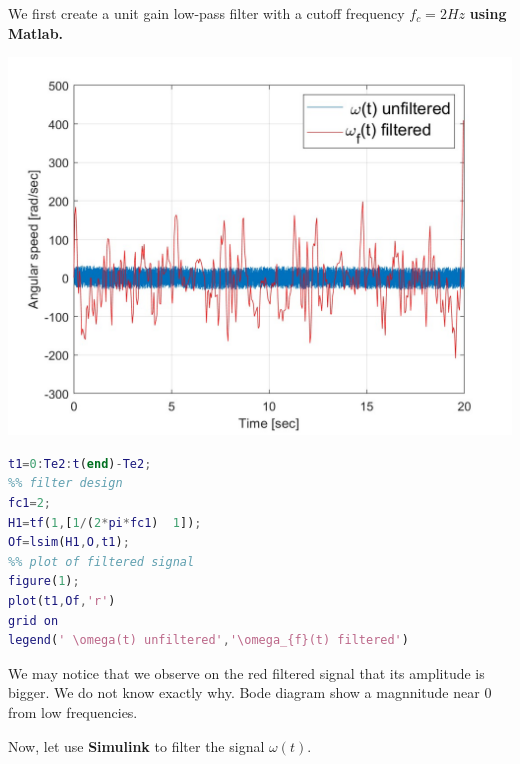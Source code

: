 \documentclass[a4paper,12pt]{article}
\begin{document}
\begin{enumerate}[label={\color{blue}\arabic*)}]
  We first create a unit gain low-pass filter with a cutoff frequency \(f_c = 2 Hz\) \textbf{using Matlab.}
  \begin{multicols}{2}
\begin{flushleft}
\includegraphics[scale=0.2]{Figures/q6a.jpg}
\label{F3}
\end{flushleft}
\columnbreak
\begin{lstlisting}[style=Matlab-editor,language=Matlab, caption={Code for Figure 4}, captionpos=b, basicstyle=\small\ttfamily]
%create the new time vector 
t1=0:Te2:t(end)-Te2;
%% filter design
fc1=2;
H1=tf(1,[1/(2*pi*fc1)  1]);
Of=lsim(H1,O,t1);
%% plot of filtered signal
figure(1);
plot(t1,Of,'r')
grid on
legend(' \omega(t) unfiltered','\omega_{f}(t) filtered')
\end{lstlisting}
\end{multicols}
We may notice that we observe on the red filtered signal that its amplitude is bigger. We do not know exactly why. Bode diagram show a magnnitude near 0 from low frequencies.

Now, let use \textbf{Simulink} to filter the signal \(\omega(t)\).


\end{enumerate}
\end{document}
